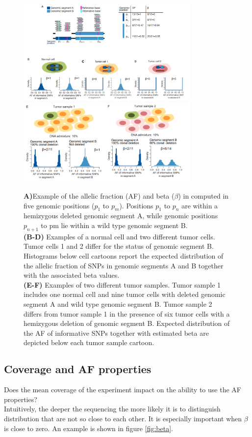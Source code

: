 \begin{figure}[htbp!]
	\centering
	\includegraphics[width=0.8\textwidth]{a.png}
	\includegraphics[width=0.8\textwidth]{b.png}
	\caption{
	\textbf{A)}Example of the allelic fraction (AF) and beta ($\beta$) in computed in five genomic positions ($p_1$ to $p_m$). Positions $p_1$ to $p_n$ are within a hemizygous deleted genomic segment A, while genomic positions $p_{n+1}$ to pm lie within a wild type genomic segment B.\\
\textbf{(B-D)} Examples of a normal cell and two different tumor cells. Tumor cells 1 and 2 differ for the status of genomic segment B. Histograms below cell cartoons report the expected distribution of the allelic fraction of SNPs in genomic segments A and B together with the associated beta values.\\
\textbf{(E-F)} Examples of two different tumor samples. Tumor sample 1 includes one normal cell and nine tumor cells with deleted genomic segment A and wild type genomic segment B. Tumor sample 2 differs from tumor sample 1 in the presence of six tumor cells with a hemizygous deletion of genomic segment B.
Expected distribution of the AF of informative SNPs together with estimated beta are depicted below each tumor sample cartoon.}
\label{fig:a_b}
\end{figure}

\subsection{Coverage and AF properties}
Does the mean coverage of the experiment impact on the ability to use the AF properties?\\
Intuitively, the deeper the sequencing the more likely it is to distinguish distribution that are not so close to each other. It is especially important when $\beta$ is close to zero. An example is shown in figure \ref{fig:beta}.


